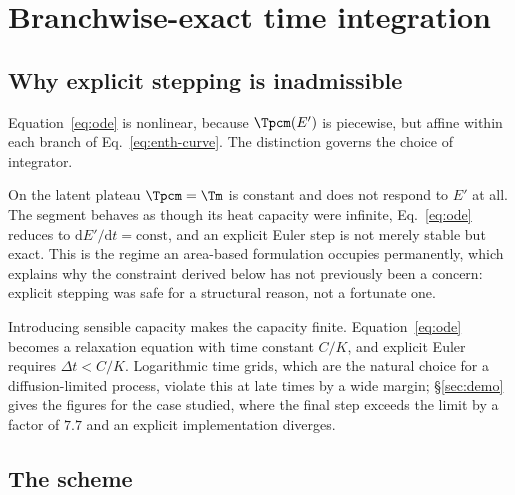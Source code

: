 \section{Branchwise-exact time integration}
\label{sec:integration}

\subsection{Why explicit stepping is inadmissible}

Equation~\eqref{eq:ode} is nonlinear, because $\Tpcm(E')$ is piecewise, but
affine within each branch of Eq.~\eqref{eq:enth-curve}. The distinction governs
the choice of integrator.

On the latent plateau $\Tpcm=\Tm$ is constant and does not respond to $E'$ at
all. The segment behaves as though its heat capacity were infinite,
Eq.~\eqref{eq:ode} reduces to $\mathrm{d}E'/\mathrm{d}t=\text{const}$, and an
explicit Euler step is not merely stable but exact. This is the regime an
area-based formulation occupies permanently, which explains why the constraint
derived below has not previously been a concern: explicit stepping was safe for
a structural reason, not a fortunate one.

Introducing sensible capacity makes the capacity finite. Equation~\eqref{eq:ode}
becomes a relaxation equation with time constant $C/K$, and explicit Euler
requires $\Delta t < C/K$. Logarithmic time grids, which are the natural choice
for a diffusion-limited process, violate this at late times by a wide margin;
\S\ref{sec:demo} gives the figures for the case studied, where the final step
exceeds the limit by a factor of $7.7$ and an explicit implementation diverges.

\subsection{The scheme}

